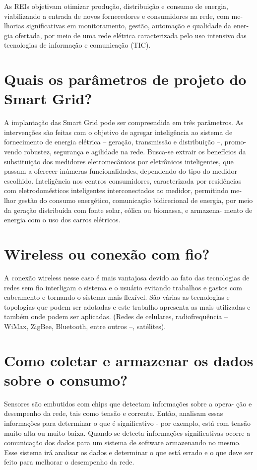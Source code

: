 	As REIs objetivam otimizar produção, distribuição e consumo de energia, viabilizando a entrada de novos fornecedores e consumidores na rede, com me- lhorias significativas em monitoramento, gestão, automação e qualidade da ener- gia ofertada, por meio de uma rede elétrica caracterizada pelo uso intensivo das tecnologias de informação e comunicação (TIC).

\section{Quais os parâmetros de projeto do Smart Grid?}

	A implantação das Smart Grid pode ser compreendida em três parâmetros. As intervenções são feitas com o objetivo de agregar inteligência ao sistema de fornecimento de energia elétrica – geração, transmissão e distribuição –, promo- vendo robustez, segurança e agilidade na rede. Busca-se extrair os benefícios da substituição dos medidores eletromecânicos por eletrônicos inteligentes, que passam a oferecer inúmeras funcionalidades, dependendo do tipo do medidor escolhido. Inteligência nos centros consumidores, caracterizada por residências com eletrodomésticos inteligentes interconectados ao medidor, permitindo me- lhor gestão do consumo energético, comunicação bidirecional de energia, por meio da geração distribuída com fonte solar, eólica ou biomassa, e armazena- mento de energia com o uso dos carros elétricos.

\section{Wireless ou conexão com fio?}

	A conexão wireless nesse caso é mais vantajosa devido ao fato das tecnologias de redes sem fio interligam o sistema e o usuário evitando trabalhos e gastos com cabeamento e tornando o sistema mais flexível. São várias as tecnologias e topologias que podem ser adotadas e este trabalho apresenta as mais utilizadas e também onde podem ser aplicadas. (Redes de celulares, radiofrequência – WiMax, ZigBee, Bluetooth, entre outros –, satélites).

\section{Como coletar e armazenar os dados sobre o consumo?}
	
	Sensores são embutidos com chips que detectam informações sobre a opera- ção e desempenho da rede, tais como tensão e corrente. Então, analisam essas informações para determinar o que é significativo - por exemplo, está com tensão muito alta ou muito baixa. Quando se detecta informações significativas ocorre a comunicação dos dados para um sistema de software armazenando no mesmo. Esse sistema irá analisar os dados e determinar o que está errado e o que deve ser feito para melhorar o desempenho da rede.
